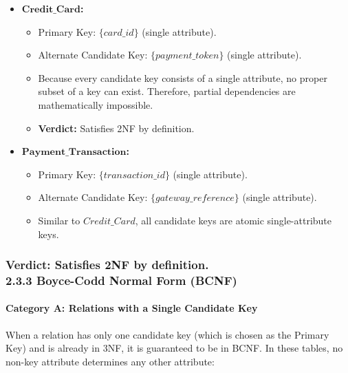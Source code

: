 \begin{itemize}
\item
  \(\mathbf{Credit\_\allowbreak{} Card}\)\textbf{:}

  \begin{itemize}
  \item
    Primary Key: \(\{ card\_\allowbreak{} id\}\) (single attribute).
  \item
    Alternate Candidate Key: \(\{ payment\_\allowbreak{} token\}\) (single attribute).
  \item
    Because every candidate key consists of a single attribute, no proper subset of a key can exist. Therefore, partial dependencies are mathematically impossible.
  \item
    \textbf{Verdict:} Satisfies 2NF by definition.
  \end{itemize}
\item
  \(\mathbf{Payment\_\allowbreak{} Transaction}\)\textbf{:}

  \begin{itemize}
  \item
    Primary Key: \(\{ transaction\_\allowbreak{} id\}\) (single attribute).
  \item
    Alternate Candidate Key: \(\{ gateway\_\allowbreak{} reference\}\) (single attribute).
  \item
    Similar to \(Credit\_\allowbreak{} Card\), all candidate keys are atomic single-attribute keys.
  \end{itemize}
\end{itemize}

\subsubsection{\texorpdfstring{\textbf{Verdict:} Satisfies 2NF by definition.\\
\textbf{2.3.3 Boyce-Codd Normal Form (BCNF)} }{Verdict: Satisfies 2NF by definition. 2.3.3 Boyce-Codd Normal Form (BCNF) }}\label{verdict-satisfies-2nf-by-definition.-2.3.3-boyce-codd-normal-form-bcnf}

\paragraph{Category A: Relations with a Single Candidate Key}\label{category-a-relations-with-a-single-candidate-key}

When a relation has only one candidate key (which is chosen as the Primary Key) and is already in 3NF, it is guaranteed to be in BCNF. In these tables, no non-key attribute determines any other attribute:

